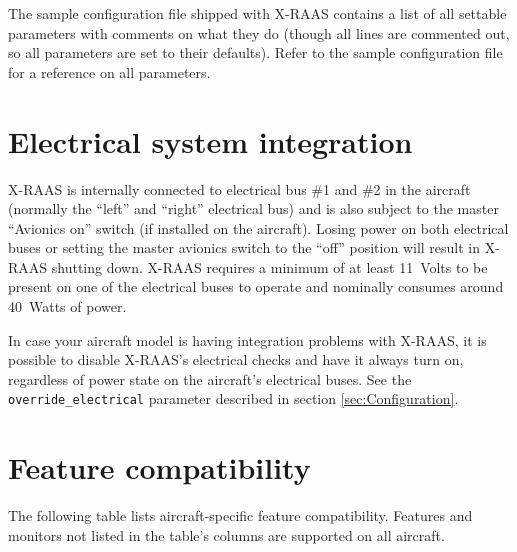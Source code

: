 \documentclass[a4paper,12pt]{article}
\newcommand{\confopt}[1]{\texttt{#1}}
\begin{document}
\noindent The sample configuration file shipped with X-RAAS contains a
list of all settable parameters with comments on what they do (though all
lines are commented out, so all parameters are set to their defaults).
Refer to the sample configuration file for a reference on all parameters.

\section{Electrical system integration}

X-RAAS is internally connected to electrical bus \#1 and \#2 in the
aircraft (normally the ``left'' and ``right'' electrical bus) and is also
subject to the master ``Avionics on'' switch (if installed on the
aircraft). Losing power on both electrical buses or setting the master
avionics switch to the ``off'' position will result in X-RAAS shutting
down. X-RAAS requires a minimum of at least 11~Volts to be present on one
of the electrical buses to operate and nominally consumes around 40~Watts
of power.

In case your aircraft model is having integration problems with X-RAAS,
it is possible to disable X-RAAS's electrical checks and have it always
turn on, regardless of power state on the aircraft's electrical buses.
See the \confopt{override\_electrical} parameter described in section
\ref{sec:Configuration}.

\section{Feature compatibility}
\label{sec:Compatibility}

The following table lists aircraft-specific feature compatibility.
Features and monitors not listed in the table's columns are supported on
all aircraft.
\end{document}
